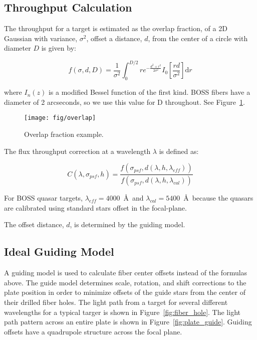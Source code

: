 \documentclass[preprint2]{aastex}
\providecommand{\fig}[1]{Figure~\ref{fig:#1}}
\begin{document}
\subsection{Throughput Calculation}

The throughput for a target is estimated as the overlap fraction, of a 2D Gaussian with variance, $\sigma^2$, offset a distance, $d$, from the center of a circle with diameter $D$ is given by:

\begin{equation}
\label{eq:overlap}
f(\sigma,d,D) = \frac{1}{\sigma ^2}\int_{0}^{D/2}  r e^{-\frac{d^2+r^2}{2 \sigma ^2}} I_{0}\left[\frac{r d}{\sigma ^2}\right] \mathrm{d}r
\end{equation}

where $I_n(z)$ is a modified Bessel function of the first kind. BOSS fibers have a diameter of 2 arcseconds, so we use this value for D throughout. See \fig{overlap}.

\begin{figure}
\centering
\texttt{[image: fig/overlap]}
\caption{Overlap fraction example.}
\label{fig:overlap}
\end{figure}

The flux throughput correction at a wavelength $\lambda$ is defined as:

\begin{equation}
\label{}
C(\lambda,\sigma_{psf},h) = \frac{f(\sigma_{psf},d(\lambda,h,\lambda_{eff}))}{f(\sigma_{psf},d(\lambda,h,\lambda_{cal}))}
\end{equation}

For BOSS quasar targets, $\lambda_{eff} = 4000$~\AA~and $\lambda_{cal} = 5400$~\AA~because the quasars are calibrated using standard stars offset in the focal-plane. 

The offset distance, $d$, is determined by the guiding model.

\subsection{Ideal Guiding Model}

A guiding model is used to calculate fiber center offsets instead of the formulas above. The guide model determines scale, rotation, and shift corrections to the plate position in order to minimize offsets of the guide stars from the center of their drilled fiber holes. The light path from a target for several different wavelengths for a typical targer is shown in \fig{fiber_hole}. The light path pattern across an entire plate is shown in \fig{plate_guide}. Guiding offsets have a quadrupole structure across the focal plane.
\end{document}
